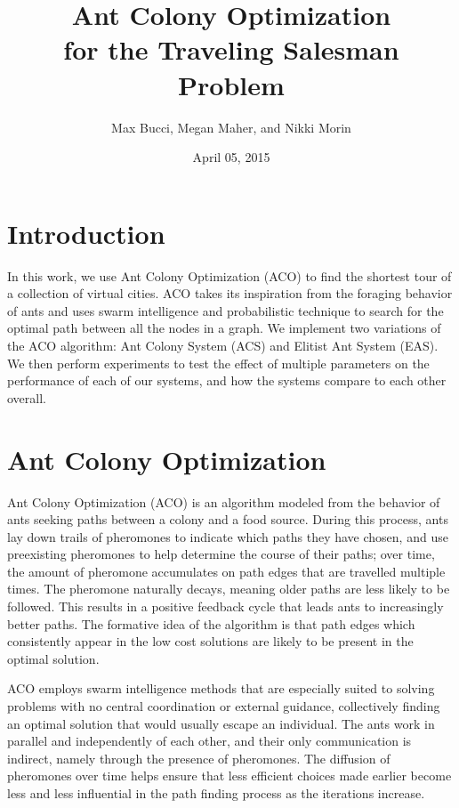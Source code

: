 \documentclass[11pt,twocolumn]{article}
\begin{document}
\title{Ant Colony Optimization\\ for the Traveling Salesman Problem} 
\author{Max Bucci, Megan Maher, and Nikki Morin}
\date{April 05, 2015}

\maketitle 



\onehalfspacing

\section{Introduction}

In this work, we use Ant Colony Optimization (ACO) to find the shortest tour of a collection of virtual cities. ACO takes its inspiration from the foraging behavior of ants and uses swarm intelligence and probabilistic technique to search for the optimal path between all the nodes in a graph. We implement two variations of the ACO algorithm: Ant Colony System (ACS) and Elitist Ant System (EAS). We then perform experiments to test the effect of multiple parameters on the performance of each of our systems, and how the systems compare to each other overall.



\section{Ant Colony Optimization}

Ant Colony Optimization (ACO) is an algorithm modeled from the behavior of ants seeking paths between a colony and a food source. During this process, ants lay down trails of pheromones to indicate which paths they have chosen, and use preexisting pheromones to help determine the course of their paths; over time, the amount of pheromone accumulates on path edges that are travelled multiple times. The pheromone naturally decays, meaning older paths are less likely to be followed. This results in a positive feedback cycle that leads ants to increasingly better paths. The formative idea of the algorithm is that path edges which consistently appear in the low cost solutions are likely to be present in the optimal solution.

ACO employs swarm intelligence methods that are especially suited to solving problems with no central coordination or external guidance, collectively finding an optimal solution that would usually escape an individual. The ants work in parallel and independently of each other, and their only communication is indirect, namely through the presence of pheromones. The diffusion of pheromones over time helps ensure that less efficient choices made earlier become less and less influential in the path finding process as the iterations increase. 
\end{document}
